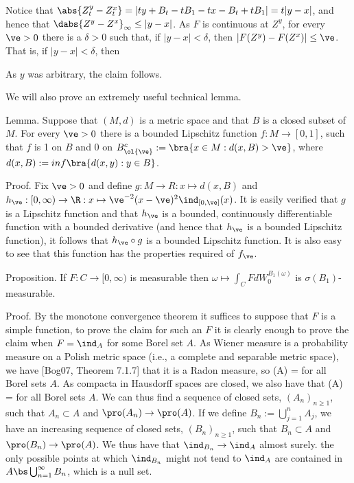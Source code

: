 Notice that $\abs{Z^y_t - Z^x_t}  = |ty + B_t - tB_1 - tx - B_t + tB_1| = t|y - x|$, and hence that $\dabs{Z^y - Z^x}_\infty \leq |y - x|$. As $F$ is continuous at $Z^y$, for every $\ve > 0$ there is a $\delta > 0$ such that, if $|y - x| < \delta$, then $|F(Z^y) - F(Z^x)| \leq \ve$. That is, if $|y - x| < \delta$, then
\be
{} \leq \ve
\ee

As $y$ was arbitrary, the claim follows.

We will also prove an extremely useful technical lemma.

Lemma. Suppose that $(M, d)$ is a metric space and that $B$ is a closed subset of $M$. For every $\ve > 0$ there is a bounded Lipschitz function $f : M \to [0, 1]$, such that $f$ is 1 on $B$ and 0 on $B^c_{\ol{\ve}} := \bra{x \in M : d(x, B) > \ve}$, where $d(x, B) := inf\bra{d(x, y) : y \in B}$.

Proof. Fix $\ve > 0$ and define $g : M \to R : x \mapsto d(x, B)$ and $h_\ve : [0, \infty) \to \R : x \mapsto \ve^{-2}(x - \ve)^2\ind_{[0,\ve]}(x)$. It is
easily verified that $g$ is a Lipschitz function and that $h_\ve$ is a bounded, continuously differentiable function with a bounded derivative (and hence that $h_\ve$ is a bounded Lipschitz function), it follows that $h_\ve \circ g$ is a bounded Lipschitz function. It is also easy to see that this function has the properties required of $f_\ve$.

Proposition. If $F : C \to [0, \infty)$ is measurable then $\omega \mapsto \int_C F dW^{B_1(\omega)}_0$ is $\sigma(B_1)$-measurable.

Proof. By the monotone convergence theorem it suffices to suppose that $F$ is a simple function, to prove the claim for such an $F$ it is clearly enough to prove the claim when $F = \ind_A$ for some Borel set $A$. As Wiener measure is a probability measure on a Polish metric space (i.e., a complete and separable metric space), we have [Bog07, Theorem 7.1.7] that it is a Radon measure, so
\be
\pro(A) = \sup{}
\ee
for all Borel sets $A$. As compacta in Hausdorff spaces are closed, we also have that
\be
\pro(A) = \sup{}
\ee
for all Borel sets $A$. We can thus find a sequence of closed sets, $(A_n)_{n\geq 1}$, such that $A_n \subset A$ and $\pro(A_n) \to \pro(A)$. If we define $B_n := \bigcup^n_{j=1} A_j$, we have an increasing sequence of closed sets, $(B_n)_{n\geq1}$, such that $B_n \subset A$ and $\pro(B_n) \to \pro(A)$. We thus have that $\ind_{B_n} \to \ind_A$ almost surely. the only possible points at which $\ind_{B_n}$ might not tend to $\ind_A$ are contained in $A \bs \bigcup^\infty_{n=1} B_n$, which is a null set.


